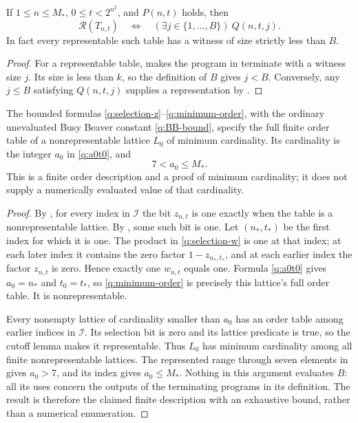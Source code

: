 \begin{lemma}\label{q:witness-cutoff}
If $1\le n\le M_*$, $0\le t<2^{n^2}$, and $P(n,t)$ holds, then
\begin{equation}\label{q:finite-cutoff}
 \mathcal R(T_{n,t})\quad\Longleftrightarrow\quad
                   (\exists j\in\{1,\ldots,B\})\ Q(n,t,j).
\end{equation}
In fact every representable such table has a witness of size strictly
less than $B$.
\end{lemma}

\begin{proof}
For a representable table,  makes the
program in  terminate with a witness size $j$.
Its size is less than $k$, so the definition of $B$ gives $j<B$.
Conversely, any $j\le B$ satisfying $Q(n,t,j)$ supplies a
representation by .
\end{proof}

\begin{theorem}\label{q:minimum}
The bounded formulas \eqref{q:selection-z}--\eqref{q:minimum-order},
with the ordinary unevaluated Busy Beaver constant
\eqref{q:BB-bound}, specify the full finite order table of a
nonrepresentable lattice $L_0$ of minimum cardinality.  Its cardinality
is the integer $a_0$ in \eqref{q:a0t0}, and
\[
                              7<a_0\le M_*.
\]
This is a finite order description and a proof of minimum cardinality;
it does not supply a numerically evaluated value of that cardinality.
\end{theorem}

\begin{proof}
By , for every index in $\mathcal I$ the bit
$z_{n,t}$ is one exactly when the table is a nonrepresentable lattice.
By , some such bit is one.  Let $(n_*,t_*)$ be
the first index for which it is one.  The product in
\eqref{q:selection-w} is one at that index; at each later index it
contains the zero factor $1-z_{n_*,t_*}$, and at each earlier index
the factor $z_{n,t}$ is zero.  Hence exactly one $w_{n,t}$ equals
one.  Formula \eqref{q:a0t0} gives $a_0=n_*$ and $t_0=t_*$, so
\eqref{q:minimum-order} is precisely this lattice's full order table.
It is nonrepresentable.

Every nonempty lattice of cardinality smaller than $a_0$ has an
order table among earlier indices in $\mathcal I$.  Its selection
bit is zero and its lattice predicate is true, so the cutoff lemma
makes it representable.  Thus $L_0$ has minimum cardinality among all
finite nonrepresentable lattices.  The represented range through
seven elements in  gives $a_0>7$, and its
index gives $a_0\le M_*$.  Nothing in this argument evaluates $B$:
all its uses concern the outputs of the terminating programs in its
definition.  The result is therefore the claimed finite description
with an exhaustive bound, rather than a numerical enumeration.
\end{proof}

